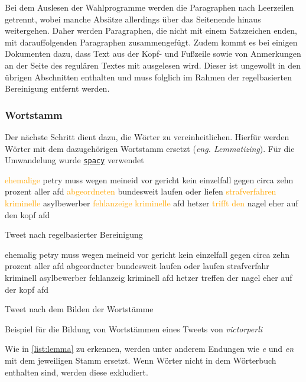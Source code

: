 Bei dem Auslesen der Wahlprogramme werden die Paragraphen nach Leerzeilen getrennt, wobei manche Absätze allerdings über das Seitenende hinaus weitergehen. Daher werden Paragraphen, die nicht mit einem Satzzeichen enden, mit darauffolgenden Paragraphen zusammengefügt. Zudem kommt es bei einigen Dokumenten dazu, dass Text aus der Kopf- und Fußzeile sowie von Anmerkungen an der Seite des regulären Textes mit ausgelesen wird. Dieser ist ungewollt in den übrigen Abschnitten enthalten und muss folglich im Rahmen der regelbasierten Bereinigung entfernt werden.

\subsubsection{Wortstamm}

Der nächste Schritt dient dazu, die Wörter zu vereinheitlichen. Hierfür werden Wörter mit dem dazugehörigen Wortstamm ersetzt (\textit{eng. Lemmatizing}). Für die Umwandelung wurde \href{https://spacy.io/}{\texttt{spacy}} verwendet


\begin{code}[H]
    \begin{subcode}{0.45\textwidth}
        \small
        \textcolor{orange}{ehemalige} petry muss wegen meineid vor gericht kein einzelfall gegen circa zehn prozent aller afd \textcolor{orange}{abgeordneten} bundesweit laufen oder liefen \textcolor{orange}{strafverfahren} \textcolor{orange}{kriminelle} asylbewerber \textcolor{orange}{fehlanzeige} \textcolor{orange}{kriminelle} afd hetzer \textcolor{orange}{trifft} \textcolor{orange}{den} nagel eher auf den kopf afd
        \caption{Tweet nach regelbasierter Bereinigung}
    \end{subcode}\hfill
    \begin{subcode}{0.45\textwidth}
        \small
        ehemalig petry muss wegen meineid vor gericht kein einzelfall gegen circa zehn prozent aller afd abgeordneter bundesweit laufen oder laufen strafverfahr kriminell asylbewerber fehlanzeig kriminell afd hetzer treffen der nagel eher auf der kopf afd
        \caption{Tweet nach dem Bilden der Wortstämme}
    \end{subcode}\hfill
    \caption[Bildung von Wortstämmen]{Beispiel für die Bildung von Wortstämmen eines Tweets von \textit{victorperli}} \label{list:lemma}
\end{code}

Wie in \autoref{list:lemma} zu erkennen, werden unter anderem Endungen wie \textit{e} und \textit{en} mit dem jeweiligen Stamm ersetzt. Wenn Wörter nicht in dem Wörterbuch enthalten sind, werden diese exkludiert.

